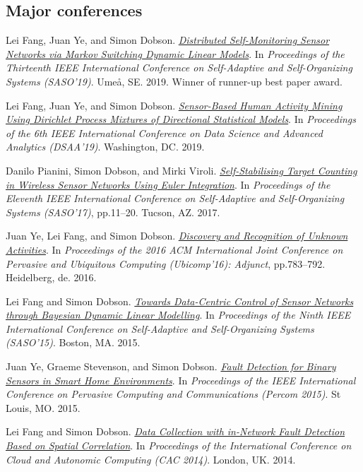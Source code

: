 \documentclass[11pt]{article}
\begin{document}
\subsection{Major conferences}
\label{sec:org358b2d5}

\label{orgd37e71b}Lei Fang, Juan Ye, and Simon Dobson.  \emph{\href{https://doi.org/10.1109/SASO.2019.00014}{Distributed Self-Monitoring Sensor Networks via Markov Switching Dynamic Linear Models}}. In \emph{Proceedings of the Thirteenth IEEE International Conference on Self-Adaptive and Self-Organizing Systems (SASO’19)}. Umeå, SE. 2019. Winner of runner-up best paper award.

\label{org9b60051}Lei Fang, Juan Ye, and Simon Dobson.  \emph{\href{https://doi.org/10.1109/DSAA.2019.00030}{Sensor-Based Human Activity Mining Using Dirichlet Process Mixtures of Directional Statistical Models}}. In \emph{Proceedings of the 6th IEEE International Conference on Data Science and Advanced Analytics (DSAA’19)}. Washington, DC. 2019.

\label{orgb49eaa5}Danilo Pianini, Simon Dobson, and Mirki Viroli.  \emph{\href{https://dx.doi.org//10.1109/SASO.2017.10}{Self-Stabilising Target Counting in Wireless Sensor Networks Using Euler Integration}}. In \emph{Proceedings of the Eleventh IEEE International Conference on Self-Adaptive and Self-Organizing Systems (SASO’17)}, pp.11–20. Tucson, AZ. 2017.

\label{org4e8b270}Juan Ye, Lei Fang, and Simon Dobson.  \emph{\href{https://dx.doi.org//10.1145/2968219.2968288}{Discovery and Recognition of Unknown Activities}}. In \emph{Proceedings of the 2016 ACM International Joint Conference on Pervasive and Ubiquitous Computing (Ubicomp’16): Adjunct}, pp.783–792. Heidelberg, de. 2016.

\label{org551ef42}Lei Fang and Simon Dobson.  \emph{\href{https://dx.doi.org//10.1109/SASO.2015.14}{Towards Data-Centric Control of Sensor Networks through Bayesian Dynamic Linear Modelling}}. In \emph{Proceedings of the Ninth IEEE International Conference on Self-Adaptive and Self-Organizing Systems (SASO’15)}. Boston, MA. 2015.

\label{orge140cf4}Juan Ye, Graeme Stevenson, and Simon Dobson.  \emph{\href{https://simondobson.org/softcopy/binarysensorfaults-15.pdf}{Fault Detection for Binary Sensors in Smart Home Environments}}. In \emph{Proceedings of the IEEE International Conference on Pervasive Computing and Communications (Percom 2015)}. St Louis, MO. 2015.

\label{org9b98f1d}Lei Fang and Simon Dobson.  \emph{\href{https://dx.doi.org//10.1109/ICCAC.2014.9}{Data Collection with in-Network Fault Detection Based on Spatial Correlation}}. In \emph{Proceedings of the International Conference on Cloud and Autonomic Computing (CAC 2014)}. London, UK. 2014.
\end{document}
